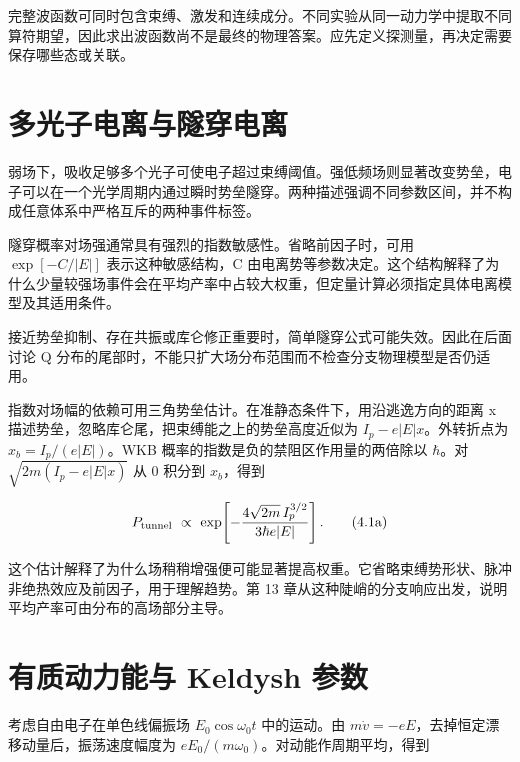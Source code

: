 \documentclass[UTF8,a4paper,zihao=-4,openany,fontset=fandol]{ctexbook}
\begin{document}
完整波函数可同时包含束缚、激发和连续成分。不同实验从同一动力学中提取不同算符期望，因此求出波函数尚不是最终的物理答案。应先定义探测量，再决定需要保存哪些态或关联。



\section{多光子电离与隧穿电离}\label{sec:04:2}


弱场下，吸收足够多个光子可使电子超过束缚阈值。强低频场则显著改变势垒，电子可以在一个光学周期内通过瞬时势垒隧穿。两种描述强调不同参数区间，并不构成任意体系中严格互斥的两种事件标签。



隧穿概率对场强通常具有强烈的指数敏感性。省略前因子时，可用 $\exp[-C/|E|]$ 表示这种敏感结构，C 由电离势等参数决定。这个结构解释了为什么少量较强场事件会在平均产率中占较大权重，但定量计算必须指定具体电离模型及其适用条件。



接近势垒抑制、存在共振或库仑修正重要时，简单隧穿公式可能失效。因此在后面讨论 Q 分布的尾部时，不能只扩大场分布范围而不检查分支物理模型是否仍适用。



指数对场幅的依赖可用三角势垒估计。在准静态条件下，用沿逃逸方向的距离 x 描述势垒，忽略库仑尾，把束缚能之上的势垒高度近似为 $I_p-e|E|x$。外转折点为 $x_b=I_p/(e|E|)$。WKB 概率的指数是负的禁阻区作用量的两倍除以 $\hbar$。对 $\sqrt{2m(I_p-e|E|x)}$ 从 0 积分到 $x_b$，得到



\begin{equation*}
P_{\rm tunnel}\ \propto\
\exp\!\left[-\frac{4\sqrt{2m}\,I_p^{3/2}}{3\hbar e |E|}\right].
\tag{4.1a}\label{eq:4.1a}
\end{equation*}


这个估计解释了为什么场稍稍增强便可能显著提高权重。它省略束缚势形状、脉冲非绝热效应及前因子，用于理解趋势。第 13 章从这种陡峭的分支响应出发，说明平均产率可由分布的高场部分主导。



\section{有质动力能与 Keldysh 参数}\label{sec:04:3}


考虑自由电子在单色线偏振场 $E_0\cos\omega_0t$ 中的运动。由 $m\dot v=-eE$，去掉恒定漂移动量后，振荡速度幅度为 $eE_0/(m\omega_0)$。对动能作周期平均，得到
\end{document}
